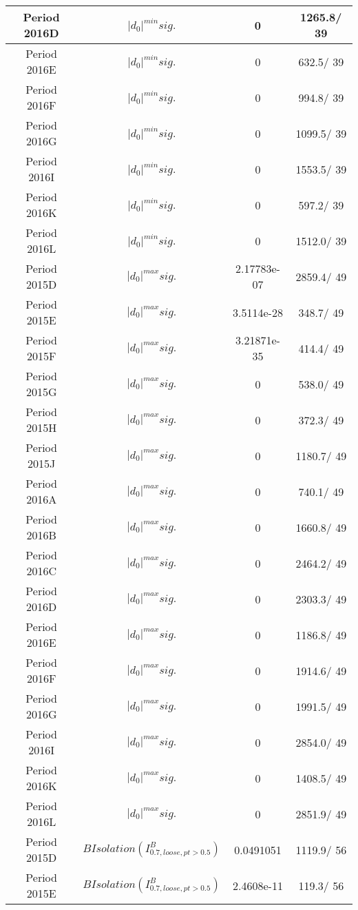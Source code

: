 \documentclass{article}
\begin{document}
\begin{longtable}{c|c|c|c}
\hline
 Period 2016D & $|d_{0}|^{min} sig.$ & 0 & 1265.8/ 39\\
\hline
 Period 2016E & $|d_{0}|^{min} sig.$ & 0 & 632.5/ 39\\
\hline
 Period 2016F & $|d_{0}|^{min} sig.$ & 0 & 994.8/ 39\\
\hline
 Period 2016G & $|d_{0}|^{min} sig.$ & 0 & 1099.5/ 39\\
\hline
 Period 2016I & $|d_{0}|^{min} sig.$ & 0 & 1553.5/ 39\\
\hline
 Period 2016K & $|d_{0}|^{min} sig.$ & 0 & 597.2/ 39\\
\hline
 Period 2016L & $|d_{0}|^{min} sig.$ & 0 & 1512.0/ 39\\
\hline
 Period 2015D & $|d_{0}|^{max} sig.$ & 2.17783e-07 & 2859.4/ 49\\
\hline
 Period 2015E & $|d_{0}|^{max} sig.$ & 3.5114e-28 & 348.7/ 49\\
\hline
 Period 2015F & $|d_{0}|^{max} sig.$ & 3.21871e-35 & 414.4/ 49\\
\hline
 Period 2015G & $|d_{0}|^{max} sig.$ & 0 & 538.0/ 49\\
\hline
 Period 2015H & $|d_{0}|^{max} sig.$ & 0 & 372.3/ 49\\
\hline
 Period 2015J & $|d_{0}|^{max} sig.$ & 0 & 1180.7/ 49\\
\hline
 Period 2016A & $|d_{0}|^{max} sig.$ & 0 & 740.1/ 49\\
\hline
 Period 2016B & $|d_{0}|^{max} sig.$ & 0 & 1660.8/ 49\\
\hline
 Period 2016C & $|d_{0}|^{max} sig.$ & 0 & 2464.2/ 49\\
\hline
 Period 2016D & $|d_{0}|^{max} sig.$ & 0 & 2303.3/ 49\\
\hline
 Period 2016E & $|d_{0}|^{max} sig.$ & 0 & 1186.8/ 49\\
\hline
 Period 2016F & $|d_{0}|^{max} sig.$ & 0 & 1914.6/ 49\\
\hline
 Period 2016G & $|d_{0}|^{max} sig.$ & 0 & 1991.5/ 49\\
\hline
 Period 2016I & $|d_{0}|^{max} sig.$ & 0 & 2854.0/ 49\\
\hline
 Period 2016K & $|d_{0}|^{max} sig.$ & 0 & 1408.5/ 49\\
\hline
 Period 2016L & $|d_{0}|^{max} sig.$ & 0 & 2851.9/ 49\\
\hline
 Period 2015D & $B Isolation (I^{B}_{0.7, loose, pt>0.5})$ & 0.0491051 & 1119.9/ 56\\
\hline
 Period 2015E & $B Isolation (I^{B}_{0.7, loose, pt>0.5})$ & 2.4608e-11 & 119.3/ 56\\

\end{longtable}
\end{document}
